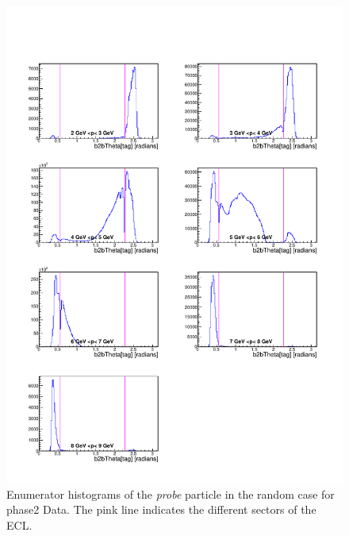 \documentclass[a4paper,11pt,twosided,final,german,openbib,pdftex,listof=totoc,bibliography=totoc]{scrbook}
\begin{document}
\begin{appendix}
\begin{figure}[!htbp]
	\centering
	\includegraphics[width=\textwidth]{Plots/master/xPMThetaRandomE_Data}
	\caption[Momentum $\theta$ Random Enumerator Histogram Phase2 Data]{Enumerator histograms of the \textit{probe} particle in the random case for phase2 Data. The pink line indicates the different sectors of the ECL.}
	\label{plt:PMThetaRandomE_Data}
\end{figure}



\end{appendix}
\end{document}
